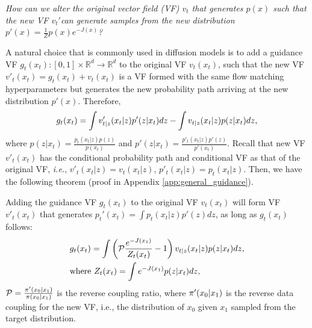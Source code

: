 \textit{How can we alter the original vector field (VF) $v_t$ that generates $p(x)$ such that the new VF $v_t'$\footnotemark can generate samples from the new distribution $p'(x) = \frac{1}{Z}p(x)e^{-J(x)}$?}


A natural choice that is commonly used in diffusion models \citep{dhariwal_diffusion_2021} is to add a guidance VF $g_t(x_t):[0,1] \times \mathbb{R}^d \to \mathbb{R}^d$
to the original VF $v_t(x_t)$, such that the new VF $v'_t(x_t) = g_t(x_t) + v_t(x_t)$ is a VF formed with the same flow matching hyperparameters but generates the new probability path arriving at the new distribution $p'(x)$. Therefore, 
\vspace{-5pt}
\begin{equation}
    \vspace{-7pt}
    \nonumber g_t(x_t) = \int v'_{t|z}(x_t|z) p'(z|x_t) dz - \int v_{t|z}(x_t|z) p(z|x_t) dz,
\end{equation}
where $p(z|x_t) = \frac{p_t(x_t|z)p(z)}{p(x_t)}$ and $p'(z|x_t) = \frac{p'_t(x_t|z)p'(z)}{p'(x_t)}$.
Recall that new VF $v'_t(x_t)$ has the conditional probability path and conditional VF as that of the original VF, \emph{i.e.}, $v'_t(x_t|z)=v_t(x_t|z)$, $p'_t(x_t|z) = p_t(x_t|z)$.
Then, we have the following theorem (proof in Appendix \ref{app:general_guidance}).
\begin{theorem}\label{theorem:general_guidance}
    Adding the guidance VF $g_t(x_t)$ to the original VF $v_t(x_t)$ will form VF $v'_t(x_t)$ that generates $p_t'(x_t) = \int p_t(x_t|z)p'(z)dz$, as long as $g_t(x_t)$ follows:
    \vspace{-5pt}
    \begin{align}\label{eq:general_guidance}
        &g_t(x_t) = \int  \left({\mathcal{P}}\frac{e^{-J(x_1)}}{Z_t(x_t)} - 1\right) v_{t|z}(x_t|z) p(z|x_t) dz, \\
        \vspace{-5pt}
        \label{eq:general_guidance_z}
        &\text{where }Z_t(x_t) = \int e^{-J(x_1)} p(z|x_t)dz,
    \end{align}
    $\mathcal{P} = \frac{\pi'(x_0|x_1)}{\pi(x_0|x_1)}$ is the reverse coupling ratio, where $\pi'(x_0|x_1)$ is the reverse data coupling for the new VF, i.e., the distribution of $x_0$ given $x_1$ sampled from the target distribution.
\end{theorem}


